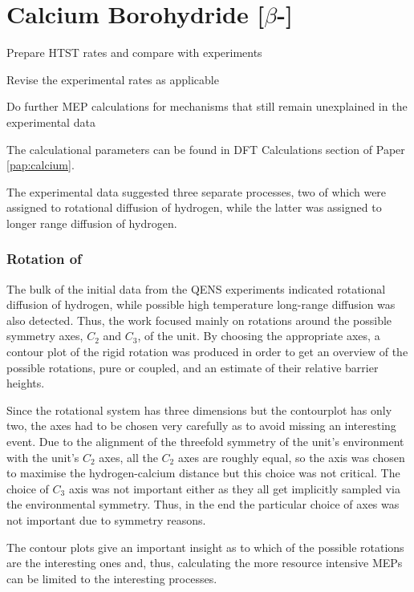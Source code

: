 \section{Calcium Borohydride [$\beta$-]}
\label{sec:borohydrides-calcium}

\bit
\item Prepare HTST rates and compare with experiments
\item Revise the experimental rates as applicable
\item Do further MEP calculations for mechanisms that still remain unexplained in the experimental data
\eit

The calculational parameters can be found in DFT Calculations section of Paper \ref{pap:calcium}.

The experimental data suggested three separate processes, two of which were assigned to rotational diffusion of hydrogen, while the latter was assigned to longer range diffusion of hydrogen.

\subsubsection{Rotation of }
The bulk of the initial data from the QENS experiments indicated rotational diffusion of hydrogen, while possible high temperature long-range diffusion was also detected.
Thus, the work focused mainly on rotations around the possible symmetry axes, $C_2$ and $C_3$, of the  unit.
By choosing the appropriate axes, a contour plot of the rigid rotation was produced in order to get an overview of the possible rotations, pure or coupled, and an estimate of their relative barrier heights.


Since the rotational system has three dimensions but the contourplot has only two, the axes had to be chosen very carefully as to avoid missing an interesting event.
Due to the alignment of the  threefold symmetry of the  unit's environment with the unit's $C_2$ axes, all the $C_2$ axes are roughly equal, so the axis was chosen to maximise the hydrogen-calcium distance but this choice was not critical.
The choice of $C_3$ axis was not important either as they all get implicitly sampled via the environmental symmetry.
Thus, in the end the particular choice of axes was not important due to symmetry reasons.

The contour plots give an important insight as to which of the possible rotations are the interesting ones and, thus, calculating the more resource intensive MEPs can be limited to the interesting processes.

